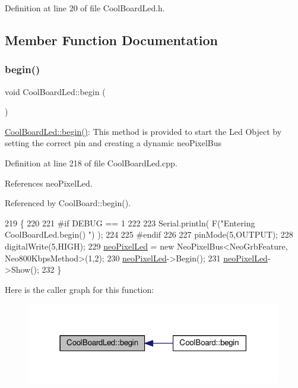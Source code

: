 Definition at line 20 of file Cool\+Board\+Led.\+h.



\subsection{Member Function Documentation}
\mbox{\label{classCoolBoardLed_ae3cbde8affcc6f011cbd698c8ef911f6}} 
\subsubsection{\texorpdfstring{begin()}{begin()}}
{\footnotesize\ttfamily void Cool\+Board\+Led\+::begin (\begin{DoxyParamCaption}{ }\end{DoxyParamCaption})}

\hyperlink{classCoolBoardLed_ae3cbde8affcc6f011cbd698c8ef911f6}{Cool\+Board\+Led\+::begin()}\+: This method is provided to start the Led Object by setting the correct pin and creating a dynamic neo\+Pixel\+Bus 

Definition at line 218 of file Cool\+Board\+Led.\+cpp.



References neo\+Pixel\+Led.



Referenced by Cool\+Board\+::begin().


\begin{DoxyCode}
219 \{
220 
221 \textcolor{preprocessor}{#if DEBUG == 1}
222 
223     Serial.println( F(\textcolor{stringliteral}{"Entering CoolBoardLed.begin() "}) );
224 
225 \textcolor{preprocessor}{#endif}
226 
227     pinMode(5,OUTPUT);
228     digitalWrite(5,HIGH);
229     \hyperlink{classCoolBoardLed_ac2c13fa462a010cd9242bf297c013923}{neoPixelLed} = \textcolor{keyword}{new} NeoPixelBus<NeoGrbFeature, Neo800KbpsMethod>(1,2); 
230     \hyperlink{classCoolBoardLed_ac2c13fa462a010cd9242bf297c013923}{neoPixelLed}->Begin();
231     \hyperlink{classCoolBoardLed_ac2c13fa462a010cd9242bf297c013923}{neoPixelLed}->Show();
232 \} 
\end{DoxyCode}
Here is the caller graph for this function\+:
\nopagebreak
\begin{figure}[H]
\begin{center}
\leavevmode
\includegraphics[width=315pt]{classCoolBoardLed_ae3cbde8affcc6f011cbd698c8ef911f6_icgraph}
\end{center}
\end{figure}
\mbox{\label{classCoolBoardLed_a27706bc029f6a126c55d0b91624ad7fa}} 
